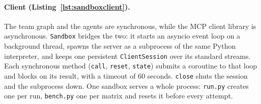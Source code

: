 \documentclass[11pt,a4paper]{article}
\DeclareRobustCommand{\code}[1]{{\renewcommand{\_}{\textunderscore\allowbreak}\texttt{#1}}}
\begin{document}
\paragraph{Client (Listing~\ref{lst:sandboxclient}).} The team graph and the agents are
synchronous, while the MCP client library is asynchronous. \code{Sandbox} bridges the
two: it starts an asyncio event loop on a background thread, spawns the server as a
subprocess of the same Python interpreter, and keeps one persistent \code{ClientSession}
over its standard streams. Each synchronous method (\code{call}, \code{reset},
\code{state}) submits a coroutine to that loop and blocks on its result, with a timeout
of 60 seconds. \code{close} shuts the session and the subprocess down. One sandbox serves a
whole process: \code{run.py} creates one per run, \code{bench.py} one per matrix and
resets it before every attempt.
\end{document}
